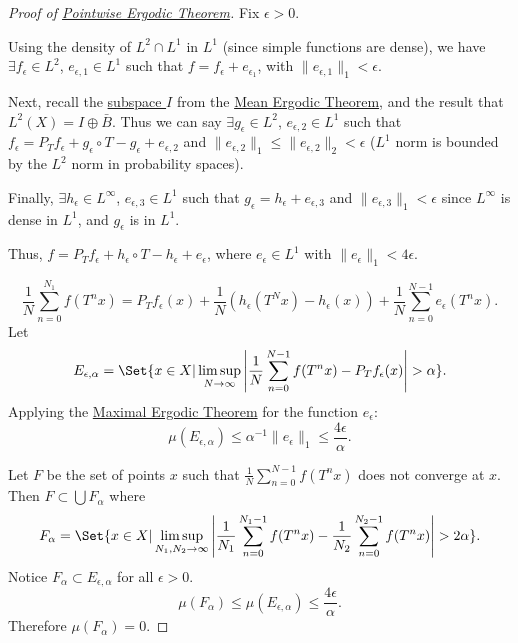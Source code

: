 \documentclass{article}
\begin{document}
\begin{proof}[Proof of \hyperlink{thm:pet}{Pointwise Ergodic Theorem}]
  Fix $\epsilon > 0$.

  Using the density of $L^2 \cap L^1$ in $L^1$ (since simple functions are dense), we have $\exists f_\epsilon \in L^2$, $e_{\epsilon,1} \in L^1$ such that $f = f_\epsilon + e_{\epsilon_1}$, with $\|e_{\epsilon,1}\|_1 < \epsilon$.

  Next, recall the \hyperlink{def:invfunc}{subspace $I$} from the \hyperlink{thm:meanet}{Mean Ergodic Theorem}, and the result that $L^2(X) = I \oplus \bar{B}$.
  Thus we can say $\exists g_\epsilon \in L^2$, $e_{\epsilon,2} \in L^1$ such that $f_\epsilon = P_T f_\epsilon + g_\epsilon \circ T - g_\epsilon + e_{\epsilon,2}$ and $\|e_{\epsilon,2}\|_1 \leq \|e_{\epsilon,2}\|_2 < \epsilon$ ($L^1$ norm is bounded by the $L^2$ norm in probability spaces).

  Finally, $\exists h_\epsilon \in L^\infty$, $e_{\epsilon, 3} \in L^1$ such that $g_\epsilon = h_\epsilon + e_{\epsilon,3}$ and $\|e_{\epsilon,3}\|_1 < \epsilon$ since $L^\infty$ is dense in $L^1$, and $g_\epsilon$ is in $L^1$.

  Thus, $f = P_T f_\epsilon + h_\epsilon \circ T - h_\epsilon + e_\epsilon$, where $e_\epsilon \in L^1$ with $\|e_\epsilon\|_1 < 4\epsilon$.

  \begin{equation*}
    \frac{1}{N} \sum_{n=0}^{N_1} f(T^nx) = P_T f_\epsilon(x) + \frac{1}{N} \left(h_\epsilon(T^N x) - h_\epsilon(x)\right) + \frac{1}{N} \sum_{n=0}^{N-1} e_\epsilon(T^nx).
  \end{equation*}
  Let
  \begin{equation*}E_{\epsilon,\alpha} = \Set{x \in X | \limsup_{N \to \infty} \left|\frac{1}{N} \sum_{n=0}^{N-1} f(T^n x) - P_T f_\epsilon(x)\right| > \alpha}.\end{equation*}
  Applying the \hyperlink{thm:maxet}{Maximal Ergodic Theorem} for the function $e_\epsilon$:
  \begin{equation*}
    \mu(E_{\epsilon,\alpha}) \leq \alpha^{-1} \|e_\epsilon\|_1 \leq \frac{4\epsilon}{\alpha}.
  \end{equation*}

  Let $F$ be the set of points $x$ such that $\frac{1}{N} \sum_{n=0}^{N-1} f(T^nx)$ does not converge at $x$.
  Then $F \subset \bigcup F_\alpha$ where
  \begin{equation*}
    F_\alpha = \Set{x \in X | \limsup_{N_1, N_2 \to \infty} \left|\frac{1}{N_1} \sum_{n=0}^{N_1 - 1} f(T^n x) - \frac{1}{N_2} \sum_{n=0}^{N_2 - 1} f(T^n x)\right| > 2\alpha}.
  \end{equation*}
  Notice $F_\alpha \subset E_{\epsilon,\alpha}$ for all $\epsilon > 0$.
  \begin{equation*}\mu(F_\alpha) \leq \mu(E_{\epsilon,\alpha}) \leq \frac{4\epsilon}{\alpha}.\end{equation*}
  Therefore $\mu(F_\alpha) = 0$.


\end{proof}
\end{document}
